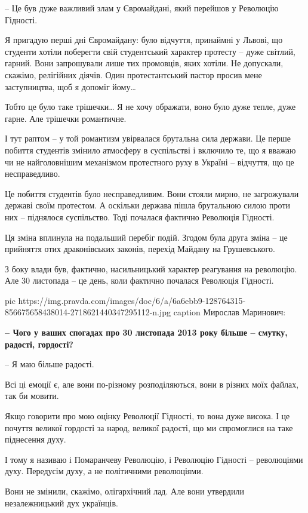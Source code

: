 – Це був дуже важливий злам у Євромайдані, який перейшов у Революцію Гідності.

Я пригадую перші дні Євромайдану: було відчуття, принаймні у Львові, що студенти хотіли поберегти свій студентський характер протесту – дуже світлий, гарний. Вони запрошували лише тих промовців, яких хотіли. Не допускали, скажімо, релігійних діячів. Один протестантський пастор просив мене заступництва, щоб я допоміг йому… 

Тобто це було таке трішечки… Я не хочу ображати, воно було дуже тепле, дуже гарне. Але трішечки романтичне.

І тут раптом – у той романтизм увірвалася брутальна сила держави. Це перше
побиття студентів змінило атмосферу в суспільстві і включило те, що я вважаю чи
не найголовнішим механізмом протестного руху в Україні – відчуття, що це
несправедливо. 

Це побиття студентів було несправедливим. Вони стояли мирно, не загрожували
державі своїм протестом. А оскільки держава пішла брутальною силою проти них –
піднялося суспільство. Тоді почалася фактично Революція Гідності. 

Ця зміна вплинула на подальший перебіг подій. Згодом була друга зміна – це
прийняття отих драконівських законів, перехід Майдану на Грушевського. 

З боку влади був, фактично, насильницький характер реагування на революцію. Але
30 листопада – це день, коли фактично почалася Революція Гідності.

\ifcmt
pic https://img.pravda.com/images/doc/6/a/6a6ebb9-128764315-856675658438014-2718621440347295112-n.jpg 
caption Мирослав Маринович: 
\fi

\textbf{– Чого у ваших спогадах про 30 листопада 2013 року більше – смутку, радості,
гордості?}

– Я маю більше радості. 

Всі ці емоції є, але вони по-різному розподіляються, вони в різних моїх файлах,
так би мовити. 

Якщо говорити про мою оцінку Революції Гідності, то вона дуже висока. І це
почуття великої гордості за народ, великої радості, що ми спромоглися на таке
піднесення духу. 

І тому я називаю і Помаранчеву Революцію, і Революцію Гідності – революціями
духу. Передусім духу, а не політичними революціями. 

Вони не змінили, скажімо, олігархічний лад. Але вони утвердили незалежницький
дух українців. 

